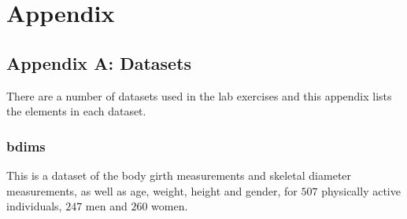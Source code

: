 \chapter{Appendix}

\section{Appendix A: Datasets}\label{app:a}

There are a number of datasets used in the lab exercises and this appendix lists the elements in each dataset.

\subsection{bdims}

This is a dataset of the body girth measurements and skeletal diameter measurements, as well as age, weight, height and gender, for $ 507 $ physically active individuals, $ 247 $ men and $ 260 $ women.

